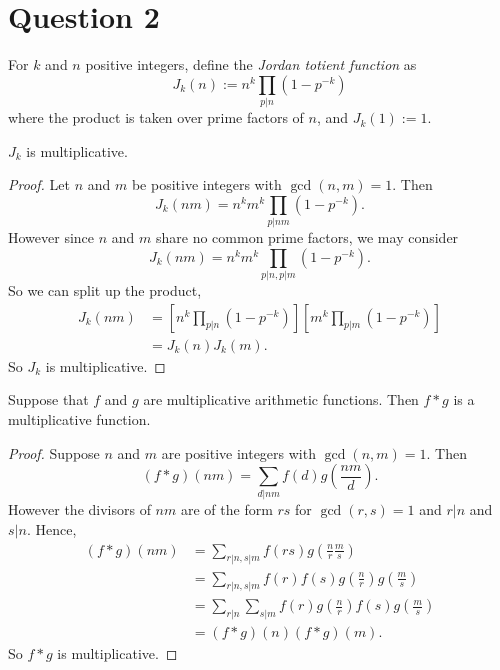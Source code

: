 \documentclass{unswmaths}
\begin{document}
\section*{Question 2}
\begin{definition}
    For $k$ and $n$ positive integers, define the \emph{Jordan totient function} as
    \begin{equation*}
        J_k(n) := n^k\prod_{p|n} (1-p^{-k})
    \end{equation*}
    where the product is taken over prime factors of $n$, and $J_k(1) := 1$.
\end{definition}
\begin{lemma}
    $J_k$ is multiplicative.
\end{lemma}
\begin{proof}
    Let $n$ and $m$ be positive integers with $\gcd(n,m) = 1$. Then
    \begin{equation*}
        J_k(nm) = n^km^k\prod_{p|nm}(1-p^{-k}).
    \end{equation*}
    However since $n$ and $m$ share no common prime factors, we may consider
    \begin{equation*}
        J_k(nm) = n^km^k\prod_{p|n,p|m} (1-p^{-k}).
    \end{equation*}
    So we can split up the product,
    \begin{align*}
        J_k(nm) &= \left[n^k\prod_{p|n}(1-p^{-k})\right]\left[m^k\prod_{p|m}(1-p^{-k})\right]\\
        &= J_k(n)J_k(m).
    \end{align*}
    So $J_k$ is multiplicative.
\end{proof}
\begin{lemma}
    Suppose that $f$ and $g$ are multiplicative arithmetic functions. Then $f*g$ is a multiplicative function.
\end{lemma}
\begin{proof}
    Suppose $n$ and $m$ are positive integers with $\gcd(n,m) = 1$. Then
    \begin{equation*}
        (f*g)(nm) = \sum_{d|nm} f(d)g\left(\frac{nm}{d}\right).
    \end{equation*}
    However the divisors of $nm$ are of the form $rs$ for $\gcd(r,s) = 1$
    and $r|n$ and $s|n$. Hence,
    \begin{align*} 
        (f*g)(nm) &= \sum_{r|n,s|m} f(rs)g\left(\frac{n}{r}\frac{m}{s}\right)\\
                  &= \sum_{r|n,s|m} f(r)f(s)g\left(\frac{n}{r}\right)g\left(\frac{m}{s}\right)\\
                  &= \sum_{r|n}\sum_{s|m} f(r)g\left(\frac{n}{r}\right)f(s)g\left(\frac{m}{s}\right)\\
                  &= (f*g)(n)(f*g)(m). 
    \end{align*}
    So $f*g$ is multiplicative.
\end{proof}
\end{document}
